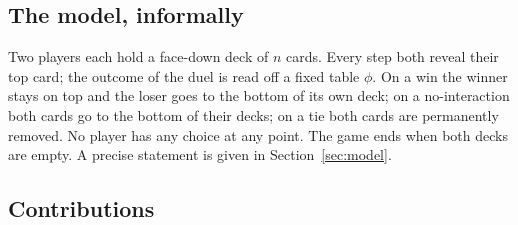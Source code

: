 \documentclass[11pt]{article}
\theoremstyle{definition}
\theoremstyle{remark}
\begin{document}
\subsection{The model, informally}
Two players each hold a face-down deck of $n$ cards. Every step both reveal their top card; the
outcome of the duel is read off a fixed table $\phi$. On a win the winner stays on top and the loser goes
to the bottom of its own deck; on a no-interaction both cards go to the bottom of their decks; on a
tie both cards are permanently removed. No player has any choice at any point. The game ends
when both decks are empty. A precise statement is given in Section~\ref{sec:model}.

\subsection{Contributions}
\end{document}
